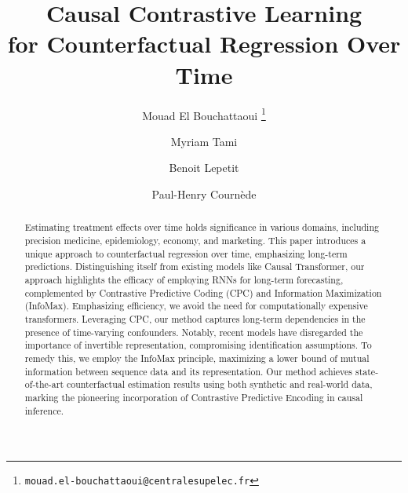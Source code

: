 \documentclass{article}
\title{Causal Contrastive Learning \\ 
            for Counterfactual Regression Over Time}
\author[1,2]{Mouad El Bouchattaoui
\thanks{\texttt{mouad.el-bouchattaoui@centralesupelec.fr}} %
}%
\author[1]{Myriam Tami}
\author[2]{Benoit Lepetit}
\author[1]{Paul-Henry Cournède}
\affil[1]{Paris-Saclay University, CentraleSupélec, MICS Lab, Gif-sur-Yvette, France}
\affil[2]{Saint-Gobain, Paris, France}
\theoremstyle{plain}
\theoremstyle{definition}
\theoremstyle{remark}
\begin{document}
%


\maketitle


\begin{abstract}
Estimating treatment effects over time holds significance in various domains, including precision medicine, epidemiology, economy, and marketing. This paper introduces a unique approach to counterfactual regression over time, emphasizing long-term predictions. Distinguishing itself from existing models like Causal Transformer, our approach highlights the efficacy of employing RNNs for long-term forecasting, complemented by Contrastive Predictive Coding (CPC) and Information Maximization (InfoMax). Emphasizing efficiency, we avoid the need for computationally expensive transformers. Leveraging CPC, our method captures long-term dependencies in the presence of time-varying confounders. Notably, recent models have disregarded the importance of invertible representation, compromising identification assumptions. To remedy this, we employ the InfoMax principle, maximizing a lower bound of mutual information between sequence data and its representation. Our method achieves state-of-the-art counterfactual estimation results using both synthetic and real-world data, marking the pioneering incorporation of Contrastive Predictive Encoding in causal inference.
\end{abstract}
\end{document}
